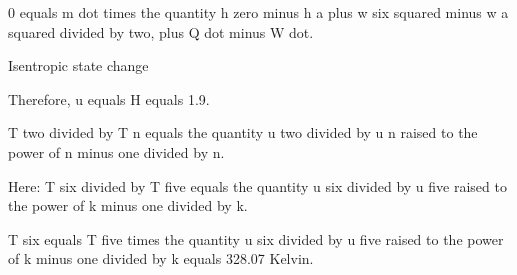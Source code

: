 0 equals m dot times the quantity h zero minus h a plus w six squared minus w a squared divided by two, plus Q dot minus W dot.  

Isentropic state change  

Therefore, u equals H equals 1.9.  

T two divided by T n equals the quantity u two divided by u n raised to the power of n minus one divided by n.  

Here:  
T six divided by T five equals the quantity u six divided by u five raised to the power of k minus one divided by k.  

T six equals T five times the quantity u six divided by u five raised to the power of k minus one divided by k equals 328.07 Kelvin.